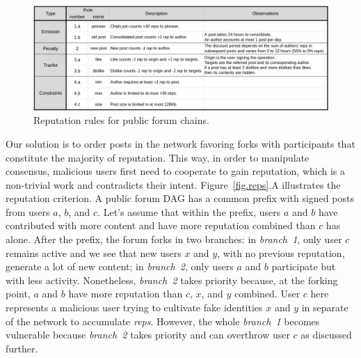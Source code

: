 \documentclass[10pt,journal,compsoc]{IEEEtran}
\newcommand{\reps}     {\emph{reps}\xspace}
\begin{document}
\begin{figure}[ht]
\centering
\includegraphics[width=\textwidth]{rules.png}
\caption{Reputation rules for public forum chains.}
\label{fig.rules}
\end{figure}

Our solution is to order posts in the network favoring forks with participants
that constitute the majority of reputation.
This way, in order to manipulate consensus, malicious users first need to
cooperate to gain reputation, which is a non-trivial work and contradicts their
intent.
%
Figure~\ref{fig.reps}.A illustrates the reputation criterion.
A public forum DAG has a common prefix with signed posts from users $a$, $b$,
and $c$.
Let's assume that within the prefix, users $a$ and $b$ have contributed with
more content and have more reputation combined than $c$ has alone.
%
After the prefix, the forum forks in two branches:
in \emph{branch~1}, only user $c$ remains active and we see that new users $x$
and $y$, with no previous reputation, generate a lot of new content;
in \emph{branch~2}, only users $a$ and $b$ participate but with less activity.
Nonetheless, \emph{branch~2} takes priority because, at the forking point, $a$
and $b$ have more reputation than $c$, $x$, and $y$ combined.
%
User $c$ here represents a malicious user trying to cultivate fake identities
$x$ and $y$ in separate of the network to accumulate \reps.
However, the whole \emph{branch~1} becomes vulnerable because \emph{branch~2}
takes priority and can overthrow user $c$ as discussed further.
\end{document}
